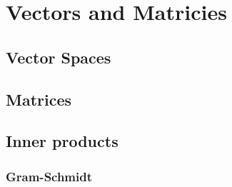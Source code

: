 \chapter{Vectors and Matricies}
\section{Vector Spaces}

\section{Matrices}

\section{Inner products}
\subsection{Gram-Schmidt}
